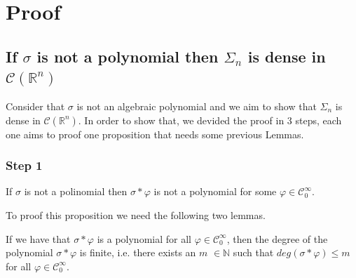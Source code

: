 \documentclass[../main.tex]{subfiles}
\begin{document}
	\section{Proof}
	\subsection{If $\sigma$ is not a polynomial then $\Sigma_n$ is dense in $\mathcal{C}(\mathbb{R}^n)$ }
	\noindent Consider that $\sigma$ is not an algebraic polynomial and we aim to show that $\Sigma_n$ is dense in $\mathcal{C}(\mathbb{R}^n)$. In order to show that, we devided the proof in 3 steps, each one aims to proof one proposition that needs some previous Lemmas. 
	
	\subsubsection{Step 1}
	\begin{propo} \label{prop1}
		If $\sigma$ is not a polinomial then $\sigma \ast \varphi$ is not a polynomial for some $\varphi \in \mathcal{C}^\infty_0$.  
	\end{propo}
	\noindent To proof this proposition we need the following two lemmas. 
	\begin{lema}  \label{lemma1}
		If we have that $\sigma \ast \varphi $ is a polynomial for all $\varphi \in \mathcal{C}^\infty_0 $, then the degree of the polynomial $\sigma \ast \varphi $ is finite, i.e. there exists an $m$ $\in \mathbb{N}$ such that $ deg (\sigma \ast \varphi) \leq m$ for all $\varphi \in \mathcal{C}^\infty_0$. 
	\end{lema}
\end{document}
